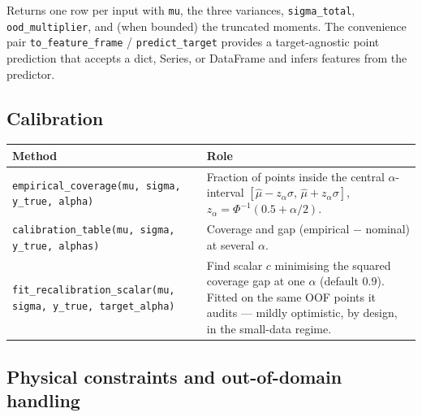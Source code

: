 \documentclass[11pt,a4paper]{article}
\newcommand{\code}[1]{\texttt{\small #1}}
\begin{document}
\noindent
Returns one row per input with \code{mu}, the three variances,
\code{sigma\_total}, \code{ood\_multiplier}, and (when bounded) the truncated
moments. The convenience pair \code{to\_feature\_frame} /
\code{predict\_target} provides a target-agnostic point prediction that accepts
a dict, Series, or DataFrame and infers features from the predictor.

\subsection{Calibration}

\begin{longtable}{@{}p{}p{}@{}}
\toprule
\textbf{Method} & \textbf{Role} \\
\midrule
\endhead
\code{empirical\_coverage(mu, sigma, y\_true, alpha)} &
  Fraction of points inside the central $\alpha$-interval
  $[\hat\mu - z_\alpha\sigma,\,\hat\mu + z_\alpha\sigma]$,
  $z_\alpha=\Phi^{-1}(0.5+\alpha/2)$. \\
\code{calibration\_table(mu, sigma, y\_true, alphas)} &
  Coverage and gap (empirical $-$ nominal) at several $\alpha$. \\
\code{fit\_recalibration\_scalar(mu, sigma, y\_true, target\_alpha)} &
  Find scalar $c$ minimising the squared coverage gap at one $\alpha$ (default
  $0.9$). Fitted on the same OOF points it audits --- mildly optimistic, by
  design, in the small-data regime. \\
\bottomrule
\end{longtable}

\subsection{Physical constraints and out-of-domain handling}
\end{document}
